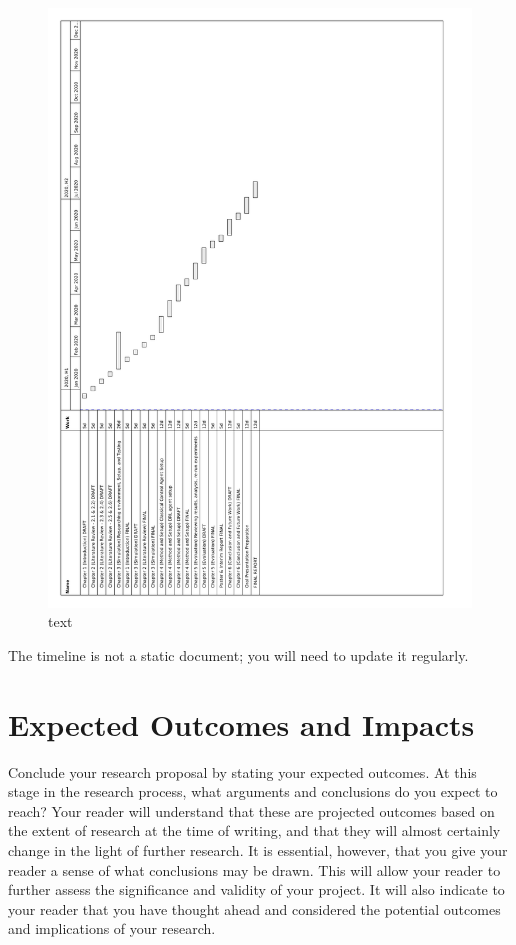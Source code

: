 \documentclass[12pt, a4paper]{article}
\begin{document}
\begin{figure}[h]
	\centering
	\includegraphics[scale=0.8]{./project_plan/project_plan}
	\caption{text}
\end{figure}

The timeline is not a static document; you will need to update it regularly.

\clearpage


\section{Expected Outcomes and Impacts}
Conclude your research proposal by stating your expected outcomes. At this stage in the research process, what arguments and conclusions do you expect to reach? Your reader will understand that these are projected outcomes based on the extent of research at the time of writing, and that they will almost certainly change in the light of further research. It is essential, however, that you give your reader a sense of what conclusions may be drawn. This will allow your reader to further assess the significance and validity of your project. It will also indicate to your reader that you have thought ahead and considered the potential outcomes and implications of your research.
\end{document}
